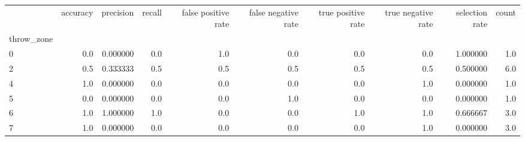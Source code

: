 \begin{tabular}{lrrrrrrrrr}
\toprule
{} &  accuracy &  precision &  recall &  false positive rate &  false negative rate &  true positive rate &  true negative rate &  selection rate &  count \\
throw\_zone &           &            &         &                      &                      &                     &                     &                 &        \\
\midrule
0          &       0.0 &   0.000000 &     0.0 &                  1.0 &                  0.0 &                 0.0 &                 0.0 &        1.000000 &    1.0 \\
2          &       0.5 &   0.333333 &     0.5 &                  0.5 &                  0.5 &                 0.5 &                 0.5 &        0.500000 &    6.0 \\
4          &       1.0 &   0.000000 &     0.0 &                  0.0 &                  0.0 &                 0.0 &                 1.0 &        0.000000 &    1.0 \\
5          &       0.0 &   0.000000 &     0.0 &                  0.0 &                  1.0 &                 0.0 &                 0.0 &        0.000000 &    1.0 \\
6          &       1.0 &   1.000000 &     1.0 &                  0.0 &                  0.0 &                 1.0 &                 1.0 &        0.666667 &    3.0 \\
7          &       1.0 &   0.000000 &     0.0 &                  0.0 &                  0.0 &                 0.0 &                 1.0 &        0.000000 &    3.0 \\
\bottomrule
\end{tabular}
